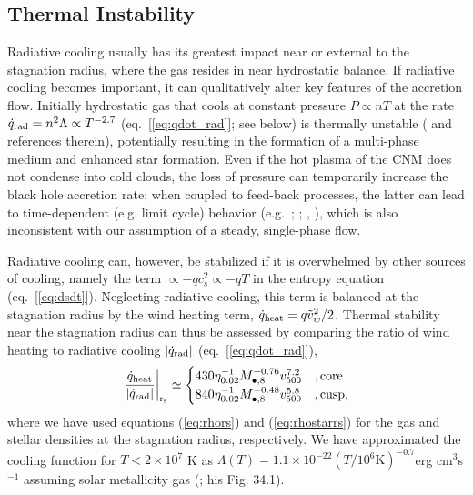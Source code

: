 \documentclass[usenatbib,fleqn]{mn2e}
\begin{document}
\subsection{Thermal Instability}
\label{sec:instability}

Radiative cooling usually has its greatest impact near or external to
the stagnation radius, where the gas resides in near hydrostatic
balance.  If radiative cooling becomes important, it can qualitatively
alter key features of the accretion flow. Initially hydrostatic gas
that cools at constant pressure $P \propto nT$ at the rate
$\dot{q}_{\rm rad} = n^{2}\Lambda \propto T^{-2.7}$
(eq.~[\ref{eq:qdot_rad}]; see below) is thermally unstable
(\citealt{McCourt+12} and references therein), potentially resulting
in the formation of a multi-phase medium and enhanced star formation.
Even if the hot plasma of the CNM does not condense into cold clouds,
the loss of pressure can temporarily increase the black hole accretion
rate; when coupled to feed-back processes, the latter can lead to
time-dependent (e.g. limit cycle) behavior
(e.g.~\citealt{Ciotti&Ostriker07}; \citealt{Ciotti+10};
\citealt{Yuan&Li11}, \citealt{Gan+14}), which is also inconsistent
with our assumption of a steady, single-phase flow.

Radiative cooling can, however, be stabilized if it is overwhelmed by other sources of cooling, namely the term $\propto -q c_{s}^{2} \propto -qT$ in the entropy equation (eq.~[\ref{eq:dsdt}]).  Neglecting radiative cooling, this term is balanced at the stagnation radius by the wind heating term, $\dot{q}_{\rm heat} = q \tilde{v}_{w}^{2}/2$.  Thermal stability near the stagnation radius can thus be assessed by comparing the ratio of wind heating to radiative cooling $|\dot{q}_{\rm rad}|$ (eq.~[\ref{eq:qdot_rad}]),
\begin{align}
\left.\frac{\dot{q}_{\rm heat}}{|\dot{q}_{\rm rad}|}\right|_{\rm r_{\rm s}} \simeq
  \begin{cases}
   430 \eta_{0.02}^{-1} M_{\bullet,8}^{-0.76}v_{500}^{7.2}  &, \text{core}\\
   840 \eta_{0.02}^{-1} M_{\bullet,8}^{-0.48}v_{500}^{5.8}  &, \text{cusp},     
  \end{cases}
  \label{eq:cooling2}
\end{align}
where we have used equations (\ref{eq:rhors}) and (\ref{eq:rhostarrs})
for the gas and stellar densities at the stagnation radius,
respectively.  We have approximated the cooling function for $T <
2\times 10^{7}$ K as $\Lambda(T) = 1.1 \times 10^{-22} \left(T/10^6
  \text{K}\right)^{-0.7} $erg cm$^3 $s$^{-1}$ assuming solar
metallicity gas (\citealt{Draine:2011a}; his Fig. 34.1).
\end{document}

